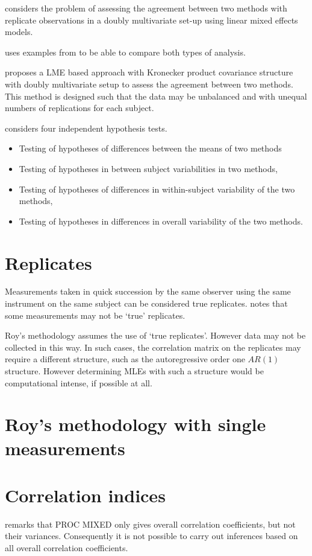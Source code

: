 \documentclass[12pt, a4paper]{article}
\theoremstyle{plain}
\theoremstyle{definition}
\theoremstyle{remark}
\begin{document}
\citet{ARoy2009} considers the problem of assessing the agreement
between two methods with replicate observations in a doubly
multivariate set-up using linear mixed effects models.


\citet{ARoy2009} uses examples from \citet{BA86} to be able to
compare both types of analysis.

\citet{ARoy2009} proposes a LME based approach with Kronecker
product covariance structure with doubly multivariate setup to
assess the agreement between two methods. This method is designed
such that the data may be unbalanced and with unequal numbers of
replications for each subject.

\citet{ARoy2009} considers four independent hypothesis tests.
\begin{itemize}
\item Testing of hypotheses of differences between the means of
two methods\item Testing of hypotheses in between subject
variabilities in two methods, \item Testing of hypotheses of
differences in within-subject variability of the two methods,
\item Testing of hypotheses in differences in overall variability
of the two methods.
\end{itemize}


\section{Replicates}
Measurements taken in quick succession by the same observer using the same instrument on the same subject can be considered true replicates. \citet{Roy2009} notes that some measurements may not be `true' replicates.

Roy's methodology assumes the use of `true replicates'. However data may not be collected in this way. In such cases, the correlation matrix on the replicates may require a different structure, such as the autoregressive order one $AR(1)$ structure. However determining MLEs with such a structure would be computational intense, if possible at all.

\section{Roy's methodology with single measurements}

\section{Correlation indices}
\citet{roy} remarks that PROC MIXED only gives overall correlation coefficients, but not their variances. Consequently it is not possible to carry out inferences based on all overall correlation coefficients.
\end{document}
